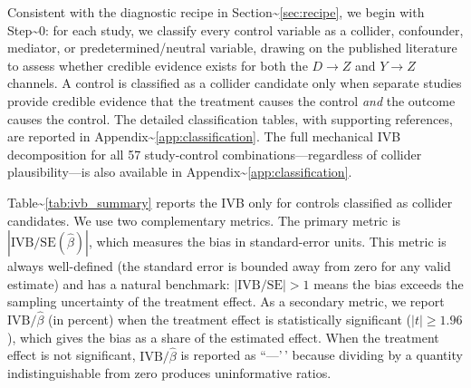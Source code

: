 \documentclass[
]{article}
\begin{document}
Consistent with the diagnostic recipe in
Section\textasciitilde{}\ref{sec:recipe}, we begin with
Step\textasciitilde0: for each study, we classify every control variable
as a collider, confounder, mediator, or predetermined/neutral variable,
drawing on the published literature to assess whether credible evidence
exists for both the \(D \to Z\) and \(Y \to Z\) channels. A control is
classified as a collider candidate only when separate studies provide
credible evidence that the treatment causes the control \textit{and} the
outcome causes the control. The detailed classification tables, with
supporting references, are reported in
Appendix\textasciitilde{}\ref{app:classification}. The full mechanical
IVB decomposition for all 57 study-control combinations---regardless of
collider plausibility---is also available in
Appendix\textasciitilde{}\ref{app:classification}.

Table\textasciitilde{}\ref{tab:ivb_summary} reports the IVB only for
controls classified as collider candidates. We use two complementary
metrics. The primary metric is \(|\text{IVB}/\text{SE}(\hat\beta)|\),
which measures the bias in standard-error units. This metric is always
well-defined (the standard error is bounded away from zero for any valid
estimate) and has a natural benchmark: \(|\text{IVB}/\text{SE}| > 1\)
means the bias exceeds the sampling uncertainty of the treatment effect.
As a secondary metric, we report \(\text{IVB}/\hat\beta\) (in percent)
when the treatment effect is statistically significant
(\(|t| \geq 1.96\)), which gives the bias as a share of the estimated
effect. When the treatment effect is not significant,
\(\text{IVB}/\hat\beta\) is reported as ``---'\,' because dividing by a
quantity indistinguishable from zero produces uninformative ratios.
\end{document}
